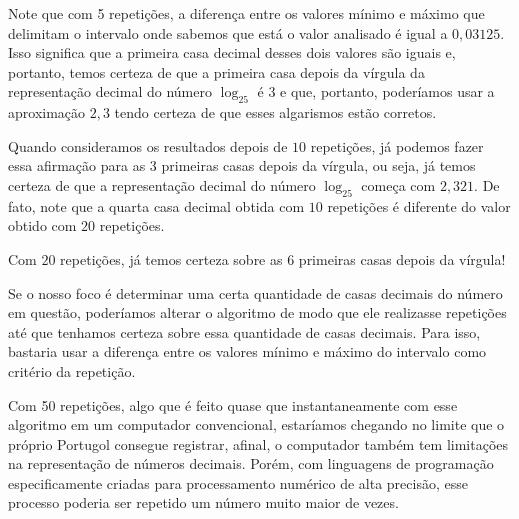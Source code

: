 Note que com 5 repetições, a diferença entre os valores mínimo e máximo que delimitam o intervalo onde sabemos que está o valor analisado é igual a $0{,}03125$. Isso significa que a primeira casa decimal desses dois valores são iguais e, portanto, temos certeza de que a primeira casa depois da vírgula da representação decimal do número $\log_25$ é 3 e que, portanto, poderíamos usar a aproximação $2{,}3$ tendo certeza de que esses algarismos estão corretos.

Quando consideramos os resultados depois de $10$ repetições, já podemos fazer essa afirmação para as $3$ primeiras casas depois da vírgula, ou seja, já temos certeza de que a representação decimal do número $\log_25$ começa com $2{,}321$. De fato, note que a quarta casa decimal obtida com $10$ repetições é diferente do valor obtido com $20$ repetições.

Com $20$ repetições, já temos certeza sobre as $6$ primeiras casas depois da vírgula!

Se o nosso foco é determinar uma certa quantidade de casas decimais do número em questão, poderíamos alterar o algoritmo de modo que ele realizasse repetições até que tenhamos certeza sobre essa quantidade de casas decimais. Para isso, bastaria usar a diferença entre os valores mínimo e máximo do intervalo como critério da repetição.

Com 50 repetições, algo que é feito quase que instantaneamente com esse algoritmo em um computador convencional, estaríamos chegando no limite que o próprio Portugol consegue registrar, afinal, o computador também tem limitações na representação de números decimais. Porém, com linguagens de programação especificamente criadas para processamento numérico de alta precisão, esse processo poderia ser repetido um número muito maior de vezes.

